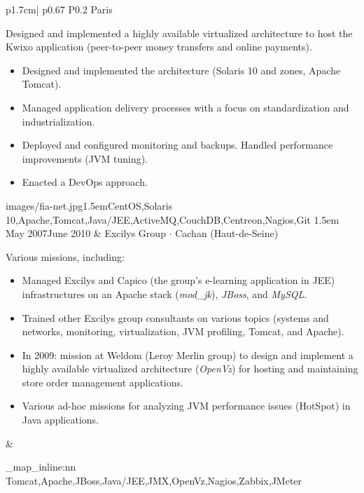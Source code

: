 \documentclass[darkhipster]{hipstercv}
\newcommand{\cvtags}[1] {
    \clist_map_inline:nn { #1 }
    {
        \cvtag{##1} %
    }
}
\newcommand{\cveventdetailed}[9]{
    {\small #1} &
    {#2 $\cdot$ \small{{#4 ~\faMapMarker}}}\vspace{.5em}\newline
    {\color{black!70}\footnotesize #5\vspace{#9}} &
    {\raisebox{-0.7\height}{\texttt{[image: \#6]}}} \vspace{#7}
    {\par \small \cvtags{#8}}
}
\begin{document}
\begin{longtable}{p{1.7cm}| p{} P{0.2\textwidth}}
        {Paris\color{cvred}}
        {
            Designed and implemented a highly available virtualized architecture to host the Kwixo application (peer-to-peer money transfers and online payments).
            \begin{itemize}
                \item Designed and implemented the architecture (Solaris 10 and zones, Apache Tomcat).
                \item Managed application delivery processes with a focus on standardization and industrialization.
                \item Deployed and configured monitoring and backups. Handled performance improvements (JVM tuning).
                \item Enacted a DevOps approach.
            \end{itemize}
        }
        {images/fia-net.jpg}{1.5em}{CentOS,Solaris 10,Apache,Tomcat,Java/JEE,ActiveMQ,CouchDB,Centreon,Nagios,Git}
        {1.5em} \\
    \cveventdetailed
        {May 2007\newline June 2010}
        {Excilys Group}
        {SRE/Architect}
        {Cachan (Haut-de-Seine)\color{cvred}}
        {
            Various missions, including:
            \begin{itemize}
                \item Managed Excilys and Capico (the group's e-learning application in JEE) infrastructures on an Apache stack (\emph{mod\_jk}), \emph{JBoss}, and \emph{MySQL}.
                \item Trained other Excilys group consultants on various topics (systems and networks, monitoring, virtualization, JVM profiling, Tomcat, and Apache).
                \item In 2009: mission at Weldom (Leroy Merlin group) to design and implement a highly available virtualized architecture (\emph{OpenVz}) for hosting and maintaining store order management applications.
                \item Various ad-hoc missions for analyzing JVM performance issues (HotSpot) in Java applications.
            \end{itemize}
        }
        {images/excilys.png}{0em}{Tomcat,Apache,JBoss,Java/JEE,JMX,OpenVz,Nagios,Zabbix,JMeter}
        {0em} \\
\end{longtable}
\end{document}
